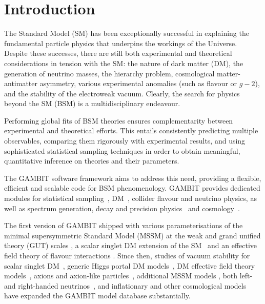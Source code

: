 \documentclass[pdftex,twocolumn,epjc3_preprint,runningheads]{svjour3}
\renewcommand{\_}{\discretionary{\underscore}{}{\underscore}}
\newcommand{\gambit}{\textsf{GAMBIT}\xspace}
\newcommand{\GB}{\gambit}
\begin{document}
\tableofcontents

\section{Introduction} \label{sec:intro}

The Standard Model (SM) has been exceptionally successful in explaining the fundamental particle physics that underpins the workings of the Universe. Despite these successes, there are still both experimental and theoretical considerations in tension with the SM: the nature of dark matter (DM), the generation of neutrino masses, the hierarchy problem, cosmological matter-antimatter asymmetry, various experimental anomalies (such as flavour or $g-2$), and the stability of the electroweak vacuum. Clearly, the search for physics beyond the SM (BSM) is a multidisciplinary endeavour.

Performing global fits of BSM theories ensures complementarity between experimental and theoretical efforts. This entails consistently predicting multiple observables, comparing them rigorously with experimental results, and using sophisticated statistical sampling techniques in order to obtain meaningful, quantitative inference on theories and their parameters.

The \GB software framework \cite{gambit,grev} aims to address this need, providing a flexible, efficient and scalable code for BSM phenomenology. \GB provides dedicated modules for statistical sampling~\cite{ScannerBit}, DM~\cite{DarkBit}, collider \cite{ColliderBit} flavour \cite{FlavBit} and neutrino \cite{RHN} physics, as well as spectrum generation, decay and precision physics~\cite{SDPBit} and cosmology~\cite{CosmoBit}.

The first version of \GB shipped with various parameterisations of the minimal supersymmetric Standard Model (MSSM) at the weak \cite{MSSM} and grand unified theory (GUT) scales \cite{CMSSM}, a scalar singlet DM extension of the SM~\cite{SSDM} and an effective field theory of flavour interactions \cite{FlavBit,Bhom:2020lmk}. Since then, studies of vacuum stability for scalar singlet DM~\cite{SSDM2}, generic Higgs portal DM models~\cite{HP}, DM effective field theory models~\cite{DMEFT, DMEFT_proceedings}, axions and axion-like particles~\cite{Axions}, additional MSSM models \cite{EWMSSM}, both left- \cite{CosmoBit_numass} and right-handed neutrinos~\cite{RHN}, and inflationary and other cosmological models \cite{CosmoBit} have expanded the \GB model database substantially.
\end{document}
